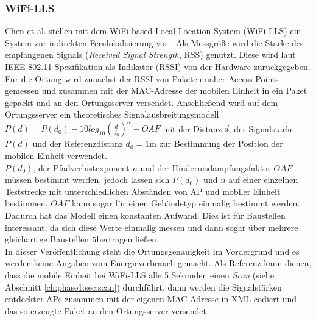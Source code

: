 \subsubsection{WiFi-LLS}
\label{ch:Vorherige:sec:LLS}
Chen et al. stellen mit dem WiFi-based Local Location System (WiFi-LLS) ein System zur indirekten Fernlokalisierung vor \cite{chen2007design}.
Als Messgröße wird die Stärke des empfangenen Signals (\emph{Received Signal Strength}, RSS) genutzt. 
Diese wird laut IEEE 802.11 Spezifikation als Indikator (RSSI) von der Hardware zurückgegeben. \\
Für die Ortung wird zunächst der RSSI von Paketen naher Access Points gemessen und zusammen mit der MAC-Adresse der mobilen Einheit in ein Paket gepackt und an den Ortungsserver versendet.
Anschließend wird auf dem Ortungsserver ein theoretisches Signalausbreitungsmodell $P(d) = P(d_0) - 10log_{10}(\frac{d}{d_0})^n - OAF$ mit der Distanz $d$, der Signalstärke $P(d)$ und der Referenzdistanz $d_0 = 1$m zur Bestimmung der Position der mobilen Einheit verwendet. \\
$P(d_0)$, der Pfadverlustexponent $n$ und der Hindernisdämpfungsfaktor $OAF$ müssen bestimmt werden, jedoch lassen sich $P(d_0)$ und $n$ auf einer einzelnen Teststrecke mit unterschiedlichen Abständen von AP und mobiler Einheit bestimmen. $OAF$ kann sogar für einen Gebäudetyp einmalig bestimmt werden.
Dadurch hat das Modell einen konstanten Aufwand. 
Dies ist für Baustellen interessant, da sich diese Werte einmalig messen und dann sogar über mehrere gleichartige Baustellen übertragen ließen.\\
In dieser Veröffentlichung steht die Ortungsgenauigkeit im Vordergrund und es werden keine Angaben zum Energieverbrauch gemacht. 
Als Referenz kann dienen, dass die mobile Einheit bei WiFi-LLS alle 5 Sekunden einen \emph{Scan} (siehe Abschnitt \ref{ch:phase1:sec:scan}) durchführt, dann werden die Signalstärken entdeckter APs zusammen mit der eigenen MAC-Adresse in XML codiert und das so erzeugte Paket an den Ortungsserver versendet.

